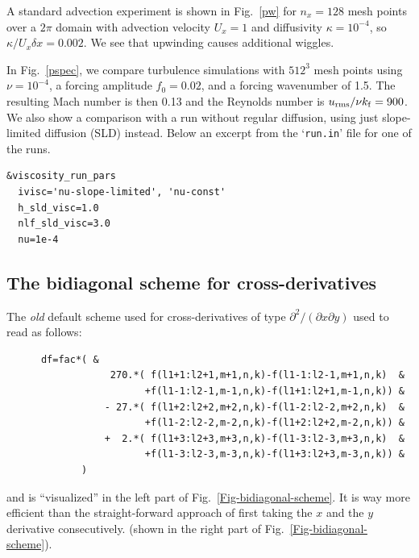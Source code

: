 \documentclass[\mydriver,12pt,twoside,notitlepage,a4paper]{article}
\makeatletter
\newcommand{\file}[2][]{%
  \def\index@{#1}%
  `\texttt{#2}'%
  \ifx\index@\@empty\index[file]{#2@\texttt{#2}}%
  \else\index[file]{#1@\texttt{#1}}%
  \fi%
}
\makeatother
\begin{document}
A standard advection experiment is shown in Fig.~\ref{pw}
for $n_x=128$ mesh points over a $2\pi$ domain with
advection velocity $U_x=1$ and diffusivity $\kappa=10^{-4}$,
so $\kappa/U_x\delta x=0.002$.
We see that upwinding causes additional wiggles.

In Fig.~\ref{pspec}, we compare turbulence simulations with $512^3$
mesh points using $\nu=10^{-4}$, a forcing amplitude $f_0=0.02$,
and a forcing wavenumber of 1.5.
The resulting Mach number is then 0.13 and the Reynolds number
is $u_{\rm rms}/\nu k_{\rm f}=900$.
We also show a comparison with a run without regular diffusion,
using just slope-limited diffusion (SLD) instead.
Below an excerpt from the \file{run.in} file for one of the runs.
\begin{verbatim}
&viscosity_run_pars
  ivisc='nu-slope-limited', 'nu-const'
  h_sld_visc=1.0
  nlf_sld_visc=3.0
  nu=1e-4
\end{verbatim}

\subsection{The bidiagonal scheme for cross-derivatives}
\label{Bidiagonal}

The {\em old} default scheme used for cross-derivatives of type
$\partial^2/(\partial x \partial y)$ used to read as follows:
\begin{verbatim}
      df=fac*( &
                  270.*( f(l1+1:l2+1,m+1,n,k)-f(l1-1:l2-1,m+1,n,k)  &
                        +f(l1-1:l2-1,m-1,n,k)-f(l1+1:l2+1,m-1,n,k)) &
                 - 27.*( f(l1+2:l2+2,m+2,n,k)-f(l1-2:l2-2,m+2,n,k)  &
                        +f(l1-2:l2-2,m-2,n,k)-f(l1+2:l2+2,m-2,n,k)) &
                 +  2.*( f(l1+3:l2+3,m+3,n,k)-f(l1-3:l2-3,m+3,n,k)  &
                        +f(l1-3:l2-3,m-3,n,k)-f(l1+3:l2+3,m-3,n,k)) &
             )
\end{verbatim}
and is ``visualized'' in the left part of Fig.~\ref{Fig-bidiagonal-scheme}.
It is way more efficient than the straight-forward approach of first
taking the $x$ and the $y$ derivative consecutively.
(shown in the right part of Fig.~\ref{Fig-bidiagonal-scheme}).
\end{document}

